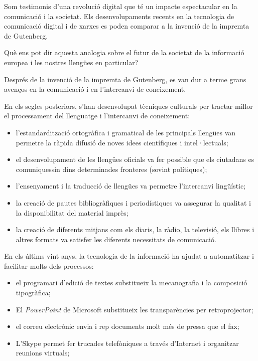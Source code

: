 \begin{multicols}{2}

Som testimonis d’una revolució digital que té un impacte espectacular en la comunicació i la societat. Els desenvolupaments recents en la tecnologia de comunicació digital i de xarxes es poden comparar a la invenció de la impremta de Gutenberg.


Què ens pot dir aquesta analogia sobre el futur de la societat de la informació europea i les nostres llengües en particular?

Després de la invenció de la impremta de Gutenberg, es van dur a terme grans avenços en la comunicació i en l’intercanvi de coneixement.

En els segles posteriors, s’han desenvolupat tècniques culturals per tractar millor el processament del llenguatge i l’intercanvi de coneixement: 
\begin{itemize}
\item l’estandardització ortogràfica i gramatical de les principals llengües van permetre la ràpida difusió de noves idees científiques i intel·lectuals;
\item el desenvolupament de les llengües oficials va fer possible que els ciutadans es comuniquessin dins determinades fronteres (sovint polítiques);
\item l’ensenyament i la traducció de llengües va permetre l’intercanvi lingüístic;
\item la creació de pautes bibliogràfiques i periodístiques va assegurar la qualitat i la disponibilitat del material imprès;
\item la creació de diferents mitjans com els diaris, la ràdio, la televisió, els llibres i altres formats va satisfer les diferents necessitats de comunicació. 
\end{itemize}
En els últims vint anys, la tecnologia de la informació ha ajudat a automatitzar i facilitar molts dels processos:
\begin{itemize}
\item el programari d’edició de textes substitueix la mecanografia i la composició tipogràfica;
\item El \textit{PowerPoint} de Microsoft substitueix les transparències per retroprojector;
\item el correu electrònic envia i rep documents molt més de pressa que el fax;
\item L’Skype permet fer trucades telefòniques a través d’Internet i organitzar reunions virtuals;

\end{itemize}
\end{multicols}
